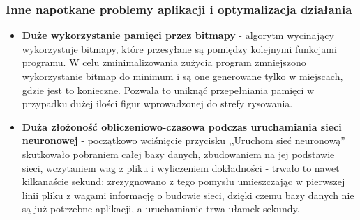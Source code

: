 \documentclass[12pt,a4paper]{article}
\begin{document}
    \subsubsection*{Inne napotkane problemy aplikacji i optymalizacja działania}
    \begin{itemize}
        \item \textbf{Duże wykorzystanie pamięci przez bitmapy} - algorytm wycinający wykorzystuje bitmapy, które przesyłane są pomiędzy kolejnymi funkcjami programu. W celu zminimalizowania zużycia program zmniejszono wykorzystanie bitmap do minimum i są one generowane tylko w miejscach, gdzie jest to konieczne. Pozwala to uniknąć przepełniania pamięci w przypadku dużej ilości figur wprowadzonej do strefy rysowania.
        \item \textbf{Duża złożoność obliczeniowo-czasowa podczas uruchamiania sieci neuronowej} - początkowo wciśnięcie przycisku ,,Uruchom sieć neuronową'' skutkowało pobraniem całej bazy danych, zbudowaniem na jej podstawie sieci, wczytaniem wag z pliku i wyliczeniem dokładności - trwało to nawet kilkanaście sekund; zrezygnowano z tego pomysłu umieszczając w pierwszej linii pliku z wagami informację o budowie sieci, dzięki czemu bazy danych nie są już potrzebne aplikacji, a uruchamianie trwa ułamek sekundy.
    \end{itemize}
\end{document}
